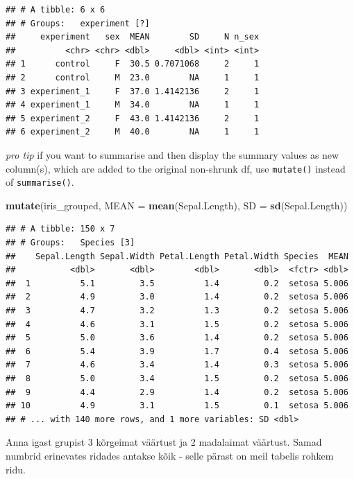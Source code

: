 \documentclass[]{book}
\newenvironment{Shaded}{\begin{snugshade}}{\end{snugshade}}
\newcommand{\KeywordTok}[1]{\textcolor[rgb]{0.13,0.29,0.53}{\textbf{#1}}}
\newcommand{\DataTypeTok}[1]{\textcolor[rgb]{0.13,0.29,0.53}{#1}}
\newcommand{\NormalTok}[1]{#1}
\begin{document}
\begin{verbatim}
## # A tibble: 6 x 6
## # Groups:   experiment [?]
##     experiment   sex  MEAN        SD     N n_sex
##          <chr> <chr> <dbl>     <dbl> <int> <int>
## 1      control     F  30.5 0.7071068     2     1
## 2      control     M  23.0        NA     1     1
## 3 experiment_1     F  37.0 1.4142136     2     1
## 4 experiment_1     M  34.0        NA     1     1
## 5 experiment_2     F  43.0 1.4142136     2     1
## 6 experiment_2     M  40.0        NA     1     1
\end{verbatim}

\emph{pro tip} if you want to summarise and then display the summary
values as new column(s), which are added to the original non-shrunk df,
use \texttt{mutate()} instead of \texttt{summarise()}.

\begin{Shaded}
\begin{Highlighting}[]
\KeywordTok{mutate}\NormalTok{(iris_grouped,}
       \DataTypeTok{MEAN =} \KeywordTok{mean}\NormalTok{(Sepal.Length), }
       \DataTypeTok{SD =} \KeywordTok{sd}\NormalTok{(Sepal.Length))}
\end{Highlighting}
\end{Shaded}

\begin{verbatim}
## # A tibble: 150 x 7
## # Groups:   Species [3]
##    Sepal.Length Sepal.Width Petal.Length Petal.Width Species  MEAN
##           <dbl>       <dbl>        <dbl>       <dbl>  <fctr> <dbl>
##  1          5.1         3.5          1.4         0.2  setosa 5.006
##  2          4.9         3.0          1.4         0.2  setosa 5.006
##  3          4.7         3.2          1.3         0.2  setosa 5.006
##  4          4.6         3.1          1.5         0.2  setosa 5.006
##  5          5.0         3.6          1.4         0.2  setosa 5.006
##  6          5.4         3.9          1.7         0.4  setosa 5.006
##  7          4.6         3.4          1.4         0.3  setosa 5.006
##  8          5.0         3.4          1.5         0.2  setosa 5.006
##  9          4.4         2.9          1.4         0.2  setosa 5.006
## 10          4.9         3.1          1.5         0.1  setosa 5.006
## # ... with 140 more rows, and 1 more variables: SD <dbl>
\end{verbatim}

Anna igast grupist 3 kõrgeimat väärtust ja 2 madalaimat väärtust. Samad
numbrid erinevates ridades antakse kõik - selle pärast on meil tabelis
rohkem ridu.
\end{document}
